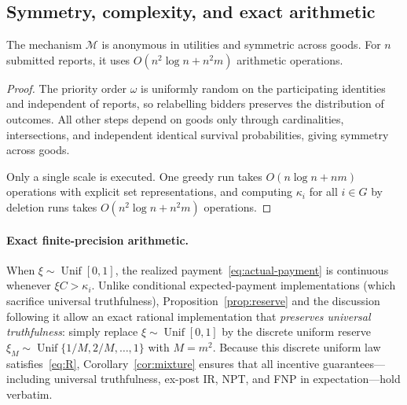 \documentclass[format=acmsmall, review=false]{acmart}
\theoremstyle{acmdefinition}%
\begin{document}
\subsection{Symmetry, complexity, and exact arithmetic}
\label{sec:rand-implementation}

\begin{proposition}\label{prop:implementation}
The mechanism \(\mathcal M\) is anonymous in utilities and
symmetric across goods. For \(n\) submitted reports, it uses
\(O(n^2\log n+n^2m)\) arithmetic operations.
\end{proposition}

\begin{proof}
The priority order \(\omega\) is uniformly random on the
participating identities and independent of reports, so
relabelling bidders preserves the distribution of outcomes. All
other steps depend on goods only through cardinalities,
intersections, and independent identical survival probabilities,
giving symmetry across goods.

Only a single scale is executed. One greedy run takes
\(O(n\log n+nm)\) operations with explicit set representations,
and computing \(\kappa_i\) for all \(i\in G\) by deletion runs
takes \(O(n^2\log n+n^2m)\) operations.
\end{proof}

\paragraph{Exact finite-precision arithmetic.}
When \(\xi\sim\operatorname{Unif}[0,1]\), the realized
payment~\eqref{eq:actual-payment} is continuous whenever
\(\xi C>\kappa_i\). Unlike conditional expected-payment
implementations (which sacrifice universal truthfulness),
Proposition~\ref{prop:reserve} and the discussion following it
allow an exact rational implementation that \emph{preserves
universal truthfulness}: simply replace
\(\xi\sim\operatorname{Unif}[0,1]\) by the discrete uniform
reserve \(\xi_M\sim\operatorname{Unif}\{1/M,2/M,\ldots,1\}\) with
\(M=m^2\). Because this discrete uniform law
satisfies~\eqref{eq:R}, Corollary~\ref{cor:mixture} ensures that
all incentive guarantees---including
universal truthfulness, ex-post IR, NPT, and FNP in
expectation---hold verbatim.
\end{document}
